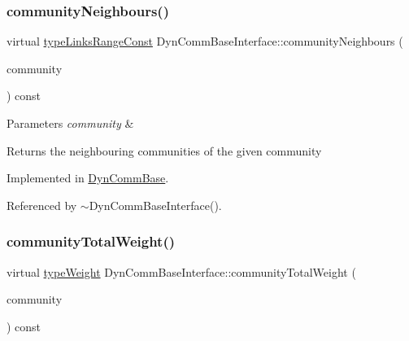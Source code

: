 \subsubsection{\texorpdfstring{community\+Neighbours()}{communityNeighbours()}}
{\footnotesize\ttfamily virtual \hyperlink{graphInterface_8h_ae8d27008f15586bbf419af7ad2e0a48a}{type\+Links\+Range\+Const} Dyn\+Comm\+Base\+Interface\+::community\+Neighbours (\begin{DoxyParamCaption}\item[{\hyperlink{graphUndirectedGroupable_8h_a914da95c9ea7f14f4b7f875c36818556}{type\+Community}}]{community }\end{DoxyParamCaption}) const\hspace{0.3cm}{\ttfamily [pure virtual]}}


\begin{DoxyParams}{Parameters}
{\em community} & \\
\hline
\end{DoxyParams}
\begin{DoxyReturn}{Returns}
the neighbouring communities of the given community 
\end{DoxyReturn}


Implemented in \hyperlink{classDynCommBase_aba6f1f0fdd67a1d7f546d63706a60cde}{Dyn\+Comm\+Base}.



Referenced by $\sim$\+Dyn\+Comm\+Base\+Interface().

\mbox{\label{classDynCommBaseInterface_a06e0b8a06e9c1067e12f574458db3eb0}} 
\subsubsection{\texorpdfstring{community\+Total\+Weight()}{communityTotalWeight()}}
{\footnotesize\ttfamily virtual \hyperlink{edge_8h_a2e7ea3be891ac8b52f749ec73fee6dd2}{type\+Weight} Dyn\+Comm\+Base\+Interface\+::community\+Total\+Weight (\begin{DoxyParamCaption}\item[{\hyperlink{graphUndirectedGroupable_8h_a914da95c9ea7f14f4b7f875c36818556}{type\+Community}}]{community }\end{DoxyParamCaption}) const\hspace{0.3cm}{\ttfamily [pure virtual]}}


